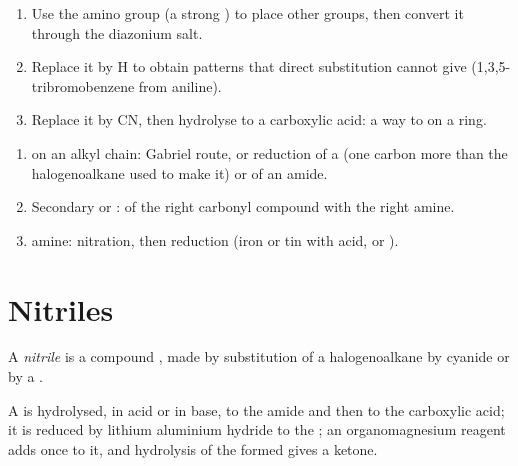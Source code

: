 \begin{method}\label{met:b2:amines:diazonium-routes}
\begin{enumerate}
  \item Use the amino group (a strong ) to place other groups, then convert it
        through the diazonium salt.
  \item Replace it by H to obtain patterns that direct substitution cannot give
        (1,3,5-tribromobenzene from aniline).
  \item Replace it by CN, then hydrolyse to a carboxylic acid: a way to  on a ring.
\end{enumerate}
\end{method}

\begin{method}\label{met:b2:amines:make-amine}
\begin{enumerate}
  \item {} on an alkyl chain: Gabriel route, or reduction of a  (one carbon
        more than the halogenoalkane used to make it) or of an amide.
  \item Secondary or :  of the right carbonyl compound with
        the right amine.
  \item {} amine: nitration, then reduction (iron or tin with acid, or ).
\end{enumerate}
\end{method}

\section{Nitriles}

\begin{definition}[Nitrile]\label{def:b2:amines:nitrile}
A \emph{nitrile} is a compound , made by substitution of a halogenoalkane
by cyanide or by a .
\end{definition}

\begin{proposition}\label{prop:b2:amines:nitrile}
A  is hydrolysed, in acid or in base, to the amide and then to the carboxylic acid; it is
reduced by lithium aluminium hydride to the  ; an organomagnesium
reagent adds once to it, and hydrolysis of the  formed gives a ketone.
\end{proposition}

